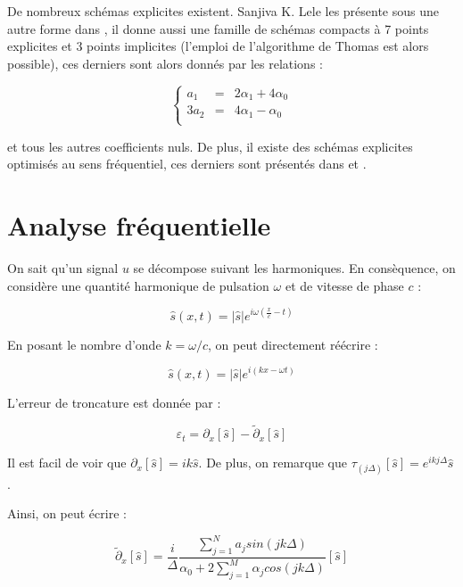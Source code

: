 \documentclass[10pt,a4paper]{amsart}
\begin{document}
De nombreux schémas explicites existent. Sanjiva K. Lele les présente sous une autre forme dans \cite{Lele}, il donne aussi une famille de schémas compacts à 7 points explicites et 3 points implicites (l'emploi de l'algorithme de Thomas est alors possible), ces derniers sont alors donnés par les relations :

\begin{equation}
\left\{
\begin{array}{rcl}
a_1 & = & 2 \alpha_1 + 4 \alpha_0 \\
3 a_2 & = & 4 \alpha_1 - \alpha_0 \\
\end{array}
\right.
\end{equation}

et tous les autres coefficients nuls. De plus, il existe des schémas explicites optimisés au sens fréquentiel, ces derniers sont présentés dans \cite{Tam Webb} et \cite{Redonnet}. 

\section{Analyse fréquentielle}

On sait qu'un signal $u$ se décompose suivant les harmoniques. En consèquence, on considère une quantité harmonique de pulsation $\omega$ et de vitesse de phase $c$ :

$$\widehat{s}(x,t) = |\widehat{s}| e^{i \omega \left( \frac{x}{c} - t \right)}$$

En posant le nombre d'onde $k=\omega / c$, on peut directement réécrire :

$$\widehat{s}(x,t) = |\widehat{s}| e^{i \left( k x - \omega t \right)}$$

L'erreur de troncature est donnée par :

$$\varepsilon_t = \partial_x \left[ \widehat{s} \right] - \tilde{\partial}_x \left[ \widehat{s} \right]$$

Il est facil de voir que $\partial_x \left[ \widehat{s} \right] = ik \widehat{s}$. De plus, on remarque que $\tau_{(j \Delta)} \left[ \widehat{s} \right] = e^{i k j \Delta} \widehat{s}$.

Ainsi, on peut écrire :

\begin{equation}
\tilde{\partial}_x \left[ \widehat{s} \right] = \dfrac{i}{\Delta} \dfrac{\sum_{j=1}^{N} a_j sin\left( j k \Delta \right) }{  \alpha_0 + 2 \sum_{j=1}^{M} \alpha_j cos \left( j k \Delta \right) } \left[ \widehat{s} \right]
\end{equation}
\end{document}
